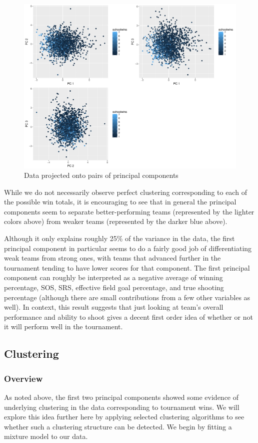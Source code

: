 \documentclass[10pt,a4paper, hidelinks]{article} %
\begin{document}
\begin{figure}[H]
	\centering
	\includegraphics[width=0.7\linewidth]{../fig/PrinComps.pdf}
	\caption{Data projected onto pairs of principal components}
	\label{fig:princomps}
\end{figure}


While we do not necessarily observe perfect clustering corresponding to each of the possible win totals, it is encouraging to see that in general the principal components seem to separate better-performing teams (represented by the lighter colors above) from weaker teams (represented by the darker blue above). 

Although it only explains roughly 25\% of the variance in the data, the first principal component in particular seems to do a fairly good job of differentiating weak teams from strong ones, with teams that advanced further in the tournament tending to have lower scores for that component. The first principal component can roughly be interpreted as a negative average of winning percentage, SOS, SRS, effective field goal percentage, and true shooting percentage (although there are small contributions from a few other variables as well). In context, this result suggests that just looking at team's overall performance and ability to shoot gives a decent first order idea of whether or not it will perform well in the tournament.

\subsection{Clustering}
\subsubsection{Overview}
As noted above, the first two principal components showed some evidence of underlying clustering in the data corresponding to tournament wins. We will explore this idea further here by applying selected clustering algorithms to see whether such a clustering structure can be detected. We begin by fitting a mixture model to our data.
\end{document}
